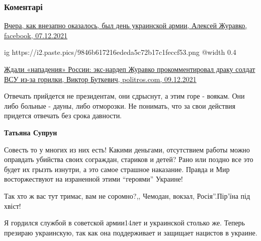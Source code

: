  
 
 
 
 
\subsubsection{Коментарі}
\label{sec:06_12_2021.fb.zhuravko_aleksej.1.den_vsu.cmt}

\begin{itemize} %
\href{https://www.facebook.com/100055408874270/posts/406250767898549/?d=n}{%
Вчера, как внезапно оказалось, был день украинской армии, Алексей Журавко, facebook, 07.12.2021%
}

\ifcmt
  ig https://i2.paste.pics/9846b617216ededa5c72b17c1feccf53.png
  @width 0.4
\fi


\href{https://politros.com/227364-zhdali-napadeniya-rossii-eks-nardep-zhuravko-prokommentiroval-draku-soldat-vsu-iz-za-gorilki}{%
Ждали «нападения» России: экс-нардеп Журавко прокомментировал драку солдат ВСУ из-за горилки, Виктор Буткевич, %
politros.com, 09.12.2021%
}


Отвечать прийдется не президентам, они сдрыснут, а этим горе - воякам. Они либо
больные - дауны, либо отморозки. Не понимать, что за свои действия придется
отвечать без срока давности.

\begin{itemize} %
\textbf{Татьяна Супрун} 

Совесть то у многих из них есть! Какими деньгами, отсутствием работы можно
оправдать убийства своих сограждан, стариков и детей? Рано или поздно все это
будет их грызть изнутри, а это самое страшное наказание. Правда и Мир
восторжествуют на израненной этими \enquote{героями} Украине!

\end{itemize} %

Так хто ж вас тут тримає, вам не соромно?,, Чемодан, вокзал, Росія''.Пір'їна під хвіст!


Я гордился службой в советской армии14лет и украинской столько же. Теперь
презираю украинскую, так как она поддерживает и защищает нацистов в украине.


\end{itemize}
